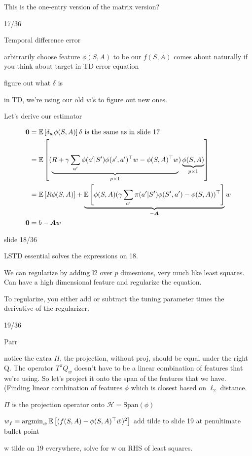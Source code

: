 \documentclass[11pt]{article}
\begin{document}
This is the one-entry version of the matrix version?

17/36

Temporal difference error

arbitrarily choose feature $\phi(S,A)$ to be our $f(S,A)$
comes about naturally if you think about target in TD error equation

figure out what $\delta$ is

in TD, we're using our old $w$'s to figure out new ones.

Let's derive our estimator

\begin{align*}
\boldsymbol{0} &= \mathbb{E}\left[ \delta_w \phi(S,A) \right] \text{$\delta$ is the same as in slide 17} \\
&=\mathbb{E}\left[ (\underbrace{R+\gamma \sum_{a'} \phi(a'|S')\phi(s', a')^\top w - \phi(S,A)^\top w}_{p \times 1})\underbrace{\phi(S,A)}_{p \times 1} \right] \\
&=\mathbb{E}\left[ R\phi(S,A) \right] + \underbrace{\mathbb{E}\left[ \phi(S,A) (\gamma \sum_{a'} \pi(a'|S')\phi(S', a') - \phi(S,A))^\top \right]}_{-\boldsymbol{A}}w \\
\boldsymbol{0} &= b - \boldsymbol{A}w
\end{align*}

slide 18/36

LSTD essential solves the expressions on 18.

We can regularize by adding l2 over $p$ dimesnions, very much like least squares. Can have a high dimensional feature and regularize the equation.

To regularize, you either add or subtract the tuning parameter times the derivative of the regularizer.

19/36

Parr

notice the extra $\Pi$, the projection, without proj, should be equal under the right Q. The operator $T^\pi Q_w$ doesn't have to be a linear combination of features that we're using. So let's project it onto the span of the features that we have. (Finding linear combination of features $\phi$ which is closest based on $\ell_2$ distance.

$\Pi$ is the projection operator onto $\mathcal{H} = \text{Span}(\phi)$

$w_f = \operatorname*{argmin}_{\tilde{w}} \mathbb{E}\left[ (f(S,A)-\phi(S,A)^\top \tilde{w})^2 \right]$
add tilde to slide 19 at penultimate bullet point

w tilde on 19 everywhere, solve for w on RHS of least squares.
\end{document}
